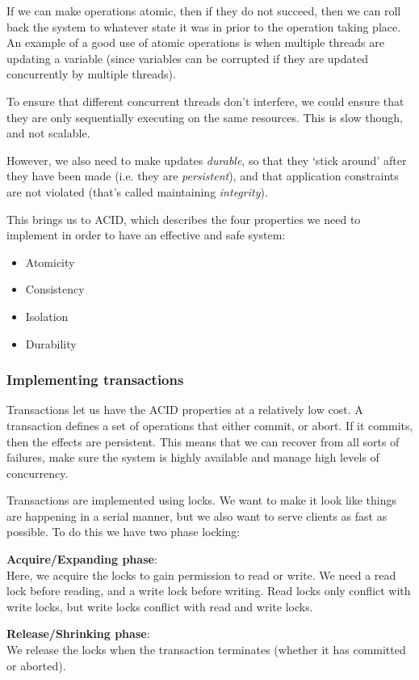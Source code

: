 If we can make operations atomic, then if they do not succeed, then we can roll
back the system to whatever state it was in prior to the operation taking place.
An example of a good use of atomic operations is when multiple threads are
updating a variable (since variables can be corrupted if they are updated
concurrently by multiple threads).

To ensure that different concurrent threads don't interfere, we could ensure
that they are only sequentially executing on the same resources. This is slow
though, and not scalable.

However, we also need to make updates \textit{durable}, so that they `stick
around' after they have been made (i.e. they are \textit{persistent}), and that
application constraints are not violated (that's called maintaining
\textit{integrity}).

This brings us to ACID, which describes the four properties we need to implement
in order to have an effective and safe system:

\begin{itemize}
  \item Atomicity
  \item Consistency
  \item Isolation
  \item Durability
\end{itemize}

\subsubsection{Implementing transactions}

Transactions let us have the ACID properties at a relatively low cost. A
transaction defines a set of operations that either commit, or abort. If it
commits, then the effects are persistent. This means that we can recover from
all sorts of failures, make sure the system is highly available and manage high
levels of concurrency.

Transactions are implemented using locks. We want to make it look like things
are happening in a serial manner, but we also want to serve clients as fast as
possible. To do this we have two phase locking:

\begin{description}
  \item \textbf{Acquire/Expanding phase}:\\
    Here, we acquire the locks to gain permission to read or write. We need a
    read lock before reading, and a write lock before writing. Read locks only
    conflict with write locks, but write locks conflict with read and write
    locks.
  \item \textbf{Release/Shrinking phase}:\\
    We release the locks when the transaction terminates (whether it has
    committed or aborted).
\end{description}

